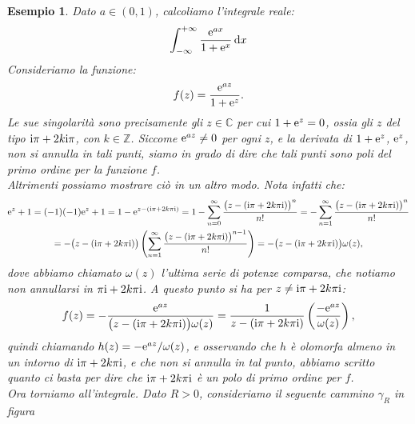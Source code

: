 \documentclass[11pt]{book}
\theoremstyle{Definizione}
\theoremstyle{TeoremaProposizioneLemmaCorollarioCongettura}
\theoremstyle{OsservazioneNotaEsempio}
\newtheorem{myes}{Esempio}[section]
\newcommand{\R}{\mathbb{R}}
\newcommand{\Z}{\mathbb{Z}}
\newcommand{\C}{\mathbb{C}}
\renewcommand{\i}{\textup{i}}
\newcommand{\e}{\textup{e}}
\renewcommand{\d}{\mathrm{d}}
\newcommand{\dx}{\,\d x}
\newcommand{\frecciaIn}{
\tikz \draw[-latex] (-1pt,0) -- (1pt,0);
}
\newcommand{\frecciaOut}{
\tikz \draw[latex-] (-1pt,0) -- (1pt,0);
}
\begin{document}
\begin{myes}\label{es:Esempio1TeoremaDeiResidui}
Dato $a\in (0,1)$, calcoliamo l'integrale reale:
$$
\int_{-\infty}^{+\infty} \frac{\e^{ax}}{1+\e^x}\dx
$$
Consideriamo la funzione:
$$
f(z) = \frac{\e^{az}}{1+\e^{z}}.
$$
Le sue singolarità sono precisamente gli $z\in \C$ per cui $1+\e^{z} = 0$, ossia gli $z$ del tipo $\i\pi+2k\i\pi$, con $k\in \Z$. Siccome $\e^{az}\neq 0$ per ogni $z$, e la derivata di $1+\e^{z}$, $\e^{z}$, non si annulla in tali punti, siamo in grado di dire che tali punti sono poli del primo ordine per la funzione $f$.\\
Altrimenti possiamo mostrare ciò in un altro modo. Nota infatti che:
\begin{gather*}
\e^{z}+1 = (-1)(-1)\e^{z}+1 = 1-\e^{z-(\i\pi+2k\pi\i)} = 1-\sum_{n = 0}^\infty \frac{\big(z-(\i\pi+2k\pi\i)\big)^n}{n!} = -\sum_{n = 1}^\infty \frac{\big(z-(\i\pi+2k\pi\i)\big)^n}{n!}\\
= -\big(z-(\i\pi+2k\pi\i)\big) \left(\sum_{n = 1}^\infty \frac{\big(z-(\i\pi+2k\pi\i)\big)^{n-1}}{n!}\right) = -\big(z-(\i\pi+2k\pi\i)\big)\omega(z),
\end{gather*}
dove abbiamo chiamato $\omega(z)$ l'ultima serie di potenze comparsa, che notiamo non annullarsi in $\pi\i+2k\pi\i$. A questo punto si ha per $z\neq \i\pi+2k\pi\i$:
$$
f(z)= -\frac{\e^{az}}{\big(z-(\i\pi+2k\pi\i)\big)\omega(z)} = \frac{1}{z-(\i\pi+2k\pi\i)}\left(\frac{-\e^{az}}{\omega(z)}\right),
$$
quindi chiamando $h(z) = -\e^{az}/\omega(z)$, e osservando che $h$ è olomorfa almeno in un intorno di $\i\pi+2k\pi\i$, e che non si annulla in tal punto, abbiamo scritto quanto ci basta per dire che $\i\pi+2k\pi\i$ è un polo di primo ordine per $f$.\\
Ora torniamo all'integrale. Dato $R > 0$, consideriamo il seguente cammino $\gamma_R$ in figura
\begin{center}
\end{center}
\end{myes}
\end{document}
